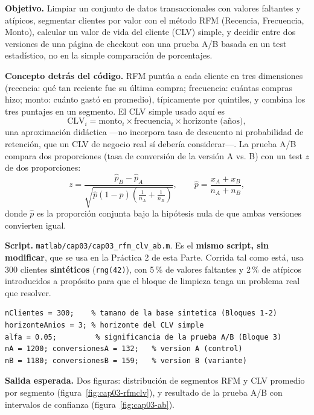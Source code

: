\begin{cajaLaboratorio}
\textbf{Objetivo.} Limpiar un conjunto de datos transaccionales con valores
faltantes y atípicos, segmentar clientes por valor con el método RFM
(Recencia, Frecuencia, Monto), calcular un valor de vida del cliente (CLV)
simple, y decidir entre dos versiones de una página de checkout con una
prueba A/B basada en un test estadístico, no en la simple comparación de
porcentajes.

\textbf{Concepto detrás del código.} RFM puntúa a cada cliente en tres
dimensiones (recencia: qué tan reciente fue su última compra; frecuencia:
cuántas compras hizo; monto: cuánto gastó en promedio), típicamente por
quintiles, y combina los tres puntajes en un segmento. El CLV simple usado
aquí es
\[
  \mathrm{CLV}_i = \text{monto}_i \times \text{frecuencia}_i \times \text{horizonte (años)},
\]
una aproximación didáctica —no incorpora tasa de descuento ni probabilidad
de retención, que un CLV de negocio real sí debería considerar—. La prueba
A/B compara dos proporciones (tasa de conversión de la versión A vs. B) con
un test $z$ de dos proporciones:
\[
  z = \frac{\hat{p}_B - \hat{p}_A}{\sqrt{\hat{p}(1-\hat{p})\left(\frac{1}{n_A}+\frac{1}{n_B}\right)}},
  \qquad \hat{p} = \frac{x_A + x_B}{n_A + n_B},
\]
donde $\hat{p}$ es la proporción conjunta bajo la hipótesis nula de que
ambas versiones convierten igual.

\textbf{Script.} \texttt{matlab/cap03/cap03\_rfm\_clv\_ab.m}. Es el
\textbf{mismo script, sin modificar}, que se usa en la Práctica 2 de esta
Parte. Corrida tal como está, usa 300 clientes \textbf{sintéticos}
(\texttt{rng(42)}), con 5\,\% de valores faltantes y 2\,\% de atípicos
introducidos a propósito para que el bloque de limpieza tenga un problema
real que resolver.

\begin{lstlisting}[style=MATLABStyle, caption={Bloque de parámetros editable (\texttt{cap03\_rfm\_clv\_ab.m}) — es lo único que cambia entre corridas.}]
nClientes = 300;    % tamano de la base sintetica (Bloques 1-2)
horizonteAnios = 3; % horizonte del CLV simple
alfa = 0.05;         % significancia de la prueba A/B (Bloque 3)
nA = 1200; conversionesA = 132;   % version A (control)
nB = 1180; conversionesB = 159;   % version B (variante)
\end{lstlisting}

\textbf{Salida esperada.} Dos figuras: distribución de segmentos RFM y CLV
promedio por segmento (figura~\ref{fig:cap03-rfmclv}), y resultado de la
prueba A/B con intervalos de confianza (figura~\ref{fig:cap03-ab}).


\end{cajaLaboratorio}
